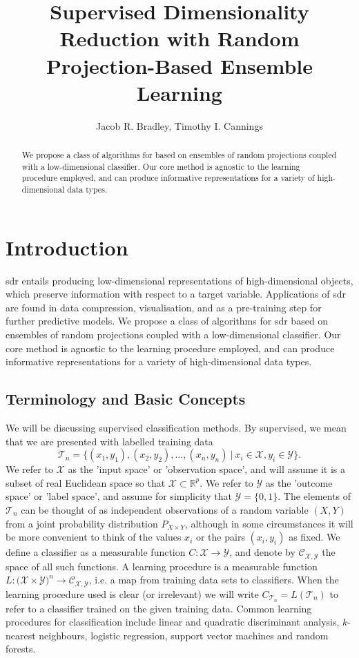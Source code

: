 \documentclass[12pt]{article}
\title{Supervised Dimensionality Reduction with Random Projection-Based Ensemble Learning}
\author{Jacob R. Bradley, Timothy I. Cannings}
\date{}
\begin{document}
\maketitle

\begin{abstract}
We propose a class of algorithms for  based on ensembles of random projections coupled with a low-dimensional classifier. Our core method is agnostic to the learning procedure employed, and can produce informative representations for a variety of high-dimensional data types.
\end{abstract}

\section{Introduction}
\gls{sdr} entails producing low-dimensional representations of high-dimensional objects, which preserve information with respect to a target variable. Applications of \gls{sdr} are found in data compression, visualisation, and as a pre-training step for further predictive models. We propose a class of algorithms for \gls{sdr} based on ensembles of random projections coupled with a low-dimensional classifier. Our core method is agnostic to the learning procedure employed, and can produce informative representations for a variety of high-dimensional data types.

\subsection{Terminology and Basic Concepts}
We will be discussing supervised classification methods. By supervised, we mean that we are presented with labelled training data 
\[ \mathcal{T}_n = \{(x_1, y_1), (x_2, y_2), \dots, (x_n, y_n) \ | \ x_i \in \mathcal{X}, y_i \in \mathcal{Y}\}. \]
We refer to $\mathcal{X}$ as the 'input space' or 'observation space', and will assume it is a subset of real Euclidean space so that $\mathcal{X} \subset \mathbb{R}^p$. We refer to $\mathcal{Y}$ as the 'outcome space' or 'label space', and assume for simplicity that $\mathcal{Y} = \{0,1\}$. The elements of $\mathcal{T}_n$ can be thought of as independent observations of a random variable $(X,Y)$ from a joint probability distribution $P_{X \times Y}$, although in some circumstances it will be more convenient to think of the values $x_i$ or the pairs $(x_i, y_i)$ as fixed. We define a classifier as a measurable function $C: \mathcal{X} \rightarrow \mathcal{Y}$, and denote by $\mathcal{C}_{\mathcal{X},\mathcal{Y}}$ the space of all such functions. A learning procedure is a measurable function $L : \mathcal(\mathcal{X} \times \mathcal{Y})^n \rightarrow \mathcal{C}_{\mathcal{X},\mathcal{Y}}$, i.e. a map from training data sets to classifiers. When the learning procedure used is clear (or irrelevant) we will write $C_{\mathcal{T}_n} = L(\mathcal{T}_n)$ to refer to a classifier trained on the given training data. Common learning procedures for classification include linear and quadratic discriminant analysis, $k$-nearest neighbours, logistic regression, support vector machines and random forests. 
\end{document}
